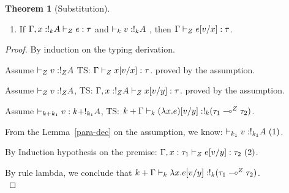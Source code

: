 \documentclass[a4paper,11pt]{article}
\theoremstyle{definition}
\newtheorem{thm}{Theorem}
\begin{document}
\begin{thm}[Substitution]
  \label{sub}
  \begin{enumerate} 
   \item If $ \Gamma,x : !_{k} A \vdash_{ Z} e : \tau $ and $
  \empty \tvdash{k} \valr : \bang{k} \ltype  $ , then  $\Gamma
  \vdash_{ Z } e[v/x]  : \tau$. 
  \end{enumerate}
\end{thm}

\begin{proof}
  By induction on the typing derivation.\\
  
Assume $\empty \tvdash{\nnatA} \valr : \bang{\nnatA}\ltype $ TS:  $\Gamma
\vdash_{Z } x[v/x]  : \tau$. proved by the assumption.\\

  
Assume $\empty \tvdash{\nnatA} \valr : \bang{\nnatA}\ltype $, TS:
   $\Gamma,   x: !_{Z}A
   \vdash_{Z } x[v/y]  : \tau$. proved by the assumption.\\


   Assume $\empty \tvdash{k+k_1 } \valr : k+ \bang{k_1} \ltype $, TS:
  $k+\Gamma
  \vdash_{ k } (\lambda x. e)[v/y]  : !_{k}  ( \tau_1
      \multimap^{Z} \tau_2)$.

 From the  Lemma~\ref{para-dec} on the assumption, we know: $\empty
  \tvdash{ k_1} \valr : \bang{k_1} \ltype ~(1)$.

  By Induction hypothesis on the premise: $ \Gamma, x:\tau_1
  \vdash_{Z }
      e[v/y]: \tau_2 ~(2)$. 

By rule lambda, we conclude that
      $k+\Gamma \vdash_{ k }
      \lambda x.e[v/y]: !_{k}  ( \tau_1
      \multimap^{Z} \tau_2) $.\\
      

\end{proof}
\end{document}
